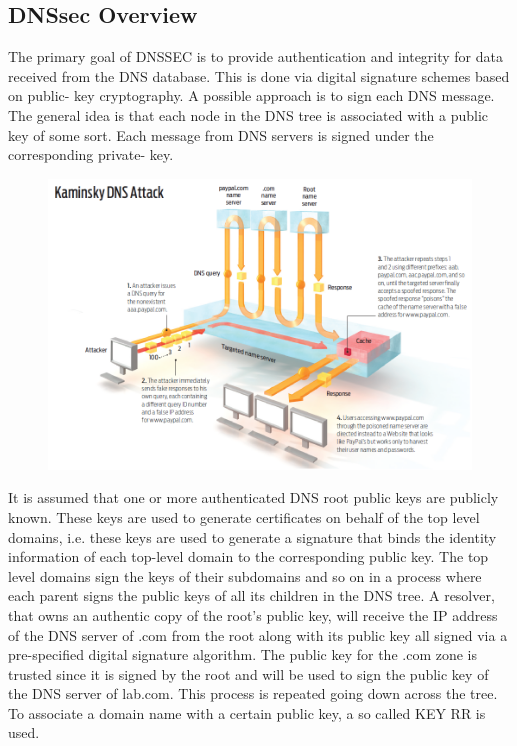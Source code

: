 \documentclass[12pt]{article}
\begin{document}
\subsection{DNSsec Overview}
The primary goal of DNSSEC is to provide authentication and integrity for data received from the DNS database.
This is done via digital signature schemes based on public-
key cryptography. A possible approach is to sign each DNS
message. The general idea is that each node in the DNS tree
is associated with a public key of some sort. Each message
from DNS servers is signed under the corresponding private-
key. 
\begin{figure}[h!]
  \centering
  \includegraphics[scale = 0.5]{Kaminsky.png}
\end{figure}

It is assumed that one or more authenticated DNS root
public keys are publicly known. These keys are used to
generate certificates on behalf of the top level domains, i.e.
these keys are used to generate a signature that binds the
identity information of each top-level domain to the corresponding public key. The top level domains sign the keys of
their subdomains and so on in a process where each parent
signs the public keys of all its children in the DNS tree. A resolver, that owns an
authentic copy of the root's public key, will receive the IP
address of the DNS server of .com from the root along with
its public key all signed via a pre-specified digital signature
algorithm. The public key for the .com zone is trusted since
it is signed by the root and will be used to sign the public
key of the DNS server of lab.com. This process is repeated
going down across the tree. To associate a domain name with a certain public key, a so called KEY RR is used.
\end{document}
